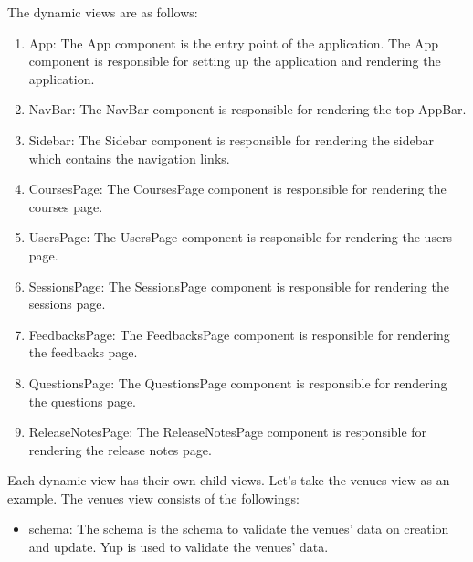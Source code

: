 \begin{justify}
        \vspace{0.25cm}
        \newendline The dynamic views are as follows:

        \begin{enumerate}
            \item App: The App component is the entry point of the application. The App component is responsible for setting up the application and rendering the application.
            \item NavBar: The NavBar component is responsible for rendering the top AppBar.
            \item Sidebar: The Sidebar component is responsible for rendering the sidebar which contains the navigation links.
            \item CoursesPage: The CoursesPage component is responsible for rendering the courses page.
            \item UsersPage: The UsersPage component is responsible for rendering the users page.
            \item SessionsPage: The SessionsPage component is responsible for rendering the sessions page.
            \item FeedbacksPage: The FeedbacksPage component is responsible for rendering the feedbacks page.
            \item QuestionsPage: The QuestionsPage component is responsible for rendering the questions page.
            \item ReleaseNotesPage: The ReleaseNotesPage component is responsible for rendering the release notes page.
        \end{enumerate}



        \vspace{0.25cm}
        \newendline Each dynamic view has their own child views. Let's take the venues view as an example. The venues view consists of the followings:

        \begin{itemize}
            \item schema: The schema is the schema to validate the venues' data on creation and update. Yup is used to validate the venues' data.
            

\end{itemize}
\end{justify}
